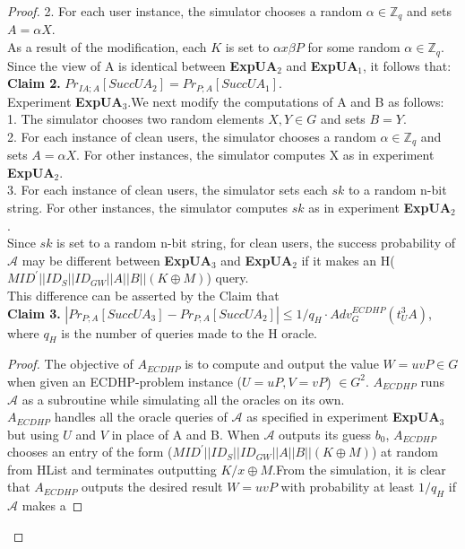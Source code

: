 \documentclass[a4paper,12pt]{report}
\begin{document}
\begin{proof}
2. For each user instance, the simulator chooses a random $\alpha \in \mathbb{Z}_q$ and sets $A = \alpha X$.\\
As a result of the modification, each $K$ is set to $\alpha x \beta P$ for some random $\alpha \in \mathbb{Z}_q$. Since the
view of A is identical between \textbf{ExpUA$_2$} and \textbf{ExpUA$_1$}, it follows that:\\
\textbf{Claim 2.} $Pr_{IA;A}[SuccUA_2] = Pr_{P;A}[SuccUA_1].$\\
\linebreak
Experiment \textbf{ExpUA$_3$}.We next modify the computations of A and B as follows:\\
1. The simulator chooses two random elements $X, Y \in G$ and sets $B = Y$.\\
2. For each instance of clean users, the simulator chooses a random $\alpha \in \mathbb{Z}_q$ and sets $A = \alpha X$. For
other instances, the simulator computes X as in experiment \textbf{ExpUA$_2$}.\\
3. For each instance of clean users, the simulator sets each $sk$ to a random n-bit string. For
other instances, the simulator computes $sk$ as in experiment \textbf{ExpUA$_2$}.\\
Since $sk$ is set to a random n-bit string, for clean users, the success probability
of $\mathcal{A}$ may be different between \textbf{ExpUA$_3$} and \textbf{ExpUA$_2$} if it makes an H($MID^{\prime}||ID_S||ID_{GW}||A||B||(K \oplus M)$) query.\\
This difference can be asserted by the Claim that\\
\textbf{Claim 3.} $| Pr_{P;A}[SuccUA_3] - Pr_{P;A}[SuccUA_2] |\leq 1/q_H \cdot Adv^{ECDHP}_G (t^3_UA)$, where $q_H$ is the
number of queries made to the H oracle.
\begin{proof}
The objective of $A_{ECDHP}$ is to compute and output the value
$W= uvP \in G$ when given an ECDHP-problem instance ($U = uP, V = vP$) $\in G^2$. $A_{ECDHP}$ runs
$\mathcal{A}$ as a subroutine while simulating all the oracles on its own.\\
$A_{ECDHP}$ handles all the oracle queries of $\mathcal{A}$ as
specified in experiment \textbf{ExpUA$_3$} but using $U$ and $V$ in
place of A and B. When $\mathcal{A}$ outputs its guess $b_0$,
$A_{ECDHP}$ chooses an entry of the form
($MID^{\prime}||ID_S||ID_{GW}||A||B||(K \oplus M)$) at random from
HList and terminates outputting $K/x \oplus M$.From the simulation,
it is clear that $A_{ECDHP}$ outputs the desired result $W= uvP$
with probability at least $1/q_H$ if $\mathcal{A}$ makes a

\end{proof}
\end{proof}
\end{document}
